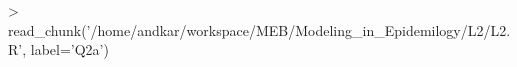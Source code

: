 \documentclass{article}
\begin{document}


\begin{Schunk}
\end{Schunk}



\begin{Schunk}
\begin{Sinput}
> read_chunk('/home/andkar/workspace/MEB/Modeling_in_Epidemilogy/L2/L2.R', label='Q2a')
\end{Sinput}
\end{Schunk}
\end{document}

